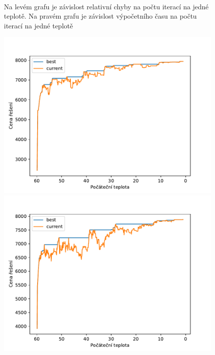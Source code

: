 \documentclass[11pt]{article}
\begin{document}
\begin{figure}
\begin{minipage}[c]{0.42\textwidth}
    \end{minipage}
    \\
   \caption{Na levém grafu je závislost relativní chyby na počtu iterací na jedné teplotě. Na pravém grafu je závislost výpočetního času na počtu iterací na jedné teplotě}\label{fig:GZNC}
\end{figure} 

\begin{figure}
	\centering
    \begin{minipage}[c]{0.32\textwidth}
        \centering\includegraphics[width=\textwidth]{img/C30.pdf} 
    \end{minipage}
    \begin{minipage}[c]{0.32\textwidth}
        \centering \includegraphics[width=\textwidth]{img/C60.pdf} 

\end{minipage}
\end{figure}
\end{document}
